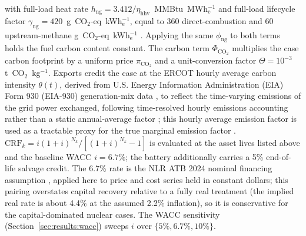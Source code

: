 \documentclass[a4paper,fleqn]{cas-sc}
\begin{document}
with full-load heat rate $h_\mathrm{ng}=3.412/\eta_\mathrm{hhv}$~MMBtu~MWh$_\mathrm{e}^{-1}$ and full-load lifecycle factor $\gamma_\mathrm{ng}=420$~g~CO$_2$-eq~kWh$_\mathrm{e}^{-1}$, equal to 360 direct-combustion and 60 upstream-methane g~CO$_2$-eq~kWh$_\mathrm{e}^{-1}$ \citep{alvarez2018methane}. Applying the same $\phi_\mathrm{ng}$ to both terms holds the fuel carbon content constant. The carbon term $\Phi_\mathrm{CO_2}$ multiplies the case carbon footprint by a uniform price $\pi_\mathrm{CO_2}$ and a unit-conversion factor $\Theta=10^{-3}$ t~CO$_2$~kg$^{-1}$. Exports credit the case at the ERCOT hourly average carbon intensity $\theta(t)$, derived from U.S. Energy Information Administration (EIA) Form 930 (EIA-930) generation-mix data \citep{eia930}, to reflect the time-varying emissions of the grid power exchanged, following time-resolved hourly emissions accounting rather than a static annual-average factor \citep{li2025ghgDemand}; this hourly average emission factor is used as a tractable proxy for the true marginal emission factor \citep{hawkes2010marginal,silerEvans2013regional}. $\mathrm{CRF}_k=i(1+i)^{N_k}/[(1+i)^{N_k}-1]$ is evaluated at the asset lives listed above and the baseline WACC $i=6.7\%$; the battery additionally carries a 5\% end-of-life salvage credit. The 6.7\% rate is the NLR ATB 2024 nominal financing assumption \citep{atb2024nuclear}, applied here to price and cost series held in constant dollars; this pairing overstates capital recovery relative to a fully real treatment (the implied real rate is about 4.4\% at the assumed 2.2\% inflation), so it is conservative for the capital-dominated nuclear cases. The WACC sensitivity (Section~\ref{sec:results:wacc}) sweeps $i$ over $\{5\%, 6.7\%, 10\%\}$.
\end{document}
